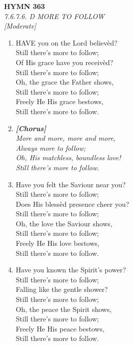 \newpage
\begin{center}
    {\Large \textbf{HYMN 363}}
    \\
    \textit{7.6.7.6. D MORE TO FOLLOW}
    \\
    \textit{\small [Moderate]}
\end{center}
\vspace{1em}

\begin{enumerate}
    \item HAVE you on the Lord believ\`ed? \\
        Still there's more to follow; \\
        Of His grace have you receiv\`ed? \\
        Still there's more to follow; \\
        Oh, the grace the Father shows, \\
        Still there's more to follow; \\
        Freely He His grace bestows, \\
        Still there's more to follow.

    \item[] \vspace{0.4em}
    \textbf{\textit{[Chorus]}} \\
    \textit{More and more, more and more,} \\
    \textit{Always more to follow;} \\
    \textit{Oh, His matchless, boundless love!} \\
    \textit{Still there's more to follow.}
    \vspace{0.4em}

    \item Have you felt the Saviour near you? \\
        Still there's more to follow; \\
        Does His bless\`ed presence cheer you? \\
        Still there's more to follow; \\
        Oh, the love the Saviour shows, \\
        Still there's more to follow; \\
        Freely He His love bestows, \\
        Still there's more to follow.

    \item Have you known the Spirit's power? \\
        Still there's more to follow; \\
        Falling like the gentle shower? \\
        Still there's more to follow; \\
        Oh, the peace the Spirit shows, \\
        Still there's more to follow; \\
        Freely He His peace bestows, \\
        Still there's more to follow.

\end{enumerate}

